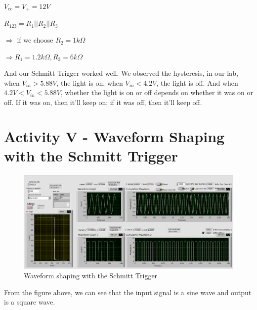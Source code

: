 \documentclass[11pt]{article}
\begin{document}
$V_{cc}=V_{+}=12V$

$R_{123}=R_{1}||R_{2}||R_{3}$

$\Rightarrow$ if we choose $R_{2}=1k\Omega$

$\Rightarrow R_{1}=1.2k\Omega, R_{3}=6k\Omega$

And our Schmitt Trigger worked well. We observed the hysteresis, in our lab, when $V_{in}>5.88V$, the light is on, when $V_{in}<4.2V$, the light is off. And when $4.2V < V_{in} < 5.88V$, whether the light is on or off depends on whether it was on or off. If it was on, then it'll keep on; if it was off, then it'll keep off.

\section{Activity V - Waveform Shaping with the Schmitt Trigger}

\begin{figure}[H]
 \begin{center}
  \includegraphics[width=\linewidth/1]{act5}
  \caption{Waveform shaping with the Schmitt Trigger}
  \label{fig:act5}
 \end{center}
\end{figure}


\vbox{}

From the figure above, we can see that the input signal is a sine wave and output is a square wave.
\end{document}
